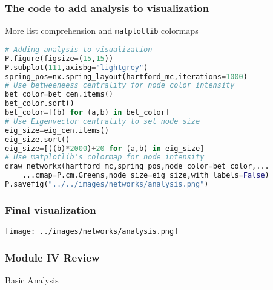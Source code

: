 \documentclass[xcolor=dvipsnames, 9pt]{beamer}
\begin{document}
\begin{frame}[fragile]
    \frametitle{The code to add analysis to visualization}
    \begin{block}{More list comprehension and \texttt{matplotlib} colormaps}
        \scriptsize{\begin{lstlisting}[language=Python]
# Adding analysis to visualization
P.figure(figsize=(15,15))
P.subplot(111,axisbg="lightgrey")
spring_pos=nx.spring_layout(hartford_mc,iterations=1000)
# Use betweeneess centrality for node color intensity
bet_color=bet_cen.items()
bet_color.sort()
bet_color=[(b) for (a,b) in bet_color]
# Use Eigenvector centrality to set node size
eig_size=eig_cen.items()
eig_size.sort()
eig_size=[((b)*2000)+20 for (a,b) in eig_size]
# Use matplotlib's colormap for node intensity 
draw_networkx(hartford_mc,spring_pos,node_color=bet_color,...
    ...cmap=P.cm.Greens,node_size=eig_size,with_labels=False)
P.savefig("../../images/networks/analysis.png")
        \end{lstlisting}}
    \end{block}
\end{frame}


\begin{frame}[fragile]
    \frametitle{Final visualization}
    \begin{center}
        \texttt{[image: ../images/networks/analysis.png]}
    \end{center}
\end{frame}



\begin{frame}[plain]
    \frametitle{Module IV Review}
    Basic Analysis
    \begin{itemize}
    \end{itemize}
\end{frame}
\end{document}
